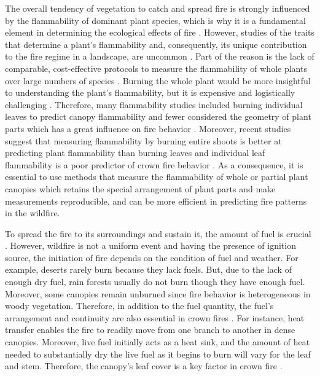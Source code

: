 \documentclass[12pt]{report}
\begin{document}
The overall tendency of vegetation to catch and spread fire is strongly influenced by the flammability of dominant plant species, which is why it is a fundamental element in determining the ecological effects of fire \citep{bond1995kill, lavorel2002predicting, bond2005fire}. However, studies of the traits that determine a plant's flammability and, consequently, its unique contribution to the fire regime in a landscape, are uncommon \citep{schwilk2015dimensions, pausas2017flammability}. Part of the reason is the lack of comparable, cost-effective protocols to measure the flammability of whole plants over large numbers of species \citep{jaureguiberry2011device}. Burning the whole plant would be more insightful to understanding the plant's flammability, but it is expensive and logistically challenging \citep{jaureguiberry2011device, pausasandmoi2012flammability}. Therefore, many flammability studies included burning individual leaves to predict canopy flammability and fewer considered the geometry of plant parts which has a great influence on fire behavior \citep{schwilk2003flammability, gao2018grass, calitz2015investigating,pausas2012fires}. Moreover, recent studies suggest that measuring flammability by burning entire shoots is better at predicting plant flammability than burning leaves \citep{alam2020shoot} and individual leaf flammability is a poor predictor of crown fire behavior \citep{fernandes2012plant}. As a consequence, it is essential to use methods that measure the flammability of whole or partial plant canopies which retains the special arrangement of plant parts and make measurements reproducible, and can be more efficient in predicting fire patterns in the wildfire.

To spread the fire to its surroundings and sustain it, the amount of fuel is crucial \citep{rothermel1972mathematical}. However, wildfire is not a uniform event and having the presence of ignition source, the initiation of fire depends on the condition of fuel and weather. For example, deserts rarely burn because they lack fuels. But, due to the lack of enough dry fuel, rain forests usually do not burn though they have enough fuel. Moreover, some canopies remain unburned since fire behavior is heterogeneous in woody vegetation. Therefore, in addition to the fuel quantity, the fuel's arrangement and continuity are also essential in crown fires \citep{bond1996fire}. For instance, heat transfer enables the fire to readily move from one branch to another in dense canopies. Moreover, live fuel initially acts as a heat sink, and the amount of heat needed to substantially dry the live fuel as it begins to burn will vary for the leaf and stem. Therefore, the canopy's leaf cover is a key factor in crown fire \citep{ray2005micrometeorological}.
\end{document}
